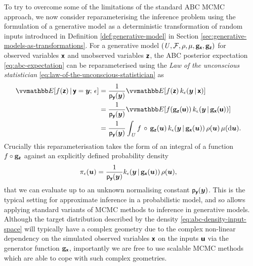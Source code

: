 To try to overcome some of the limitations of the standard \ac{ABC} \ac{MCMC} approach, we now consider reparameterising the inference problem using the formulation of a generative model as a deterministic transformation of random inputs introduced in Definition \ref{def:generative-model} in Section \ref{sec:generative-models-as-transformations}. For a generative model $(\mathit{U},\mathcal{F}\kern-.2pt,\rho,\mu,{\mathbf{g}}_{\boldsymbol{\mathsf{x}}},{\mathbf{g}}_{\boldsymbol{\mathsf{z}}})$ for observed variables $\boldsymbol{\mathsf{x}}$ and unobserved variables $\boldsymbol{\mathsf{z}}$, the \ac{ABC} posterior expectation \eqref{eq:abc-expectation} can be reparameterised using the \emph{Law of the unconscious statistician} \eqref{eq:law-of-the-unconscious-statistician} as
\begin{align}\nonumber
  \expc{f(\rvct{z}) \gvn \rvct{y}=\vct{y};\,\epsilon} &=
  \frac{1}{\pden{\rvct{y}}(\vct{y})} \expc{f(\rvct{z}) \, k_\epsilon(\vct{y}\gvn\rvct{x})}
  \\\label{eq:abc-expectation-input-space}
  &=
  \frac{1}{\pden{\rvct{y}}(\vct{y})} 
  \expc{f\lpa\genfunc_{\rvct{z}}(\rvct{u})\rpa \, k_\epsilon\lpa\vct{y}\gvn\genfunc_{\rvct{x}}(\rvct{u})\rpa}
  \\ \nonumber
  &=
  \frac{1}{\pden{\rvct{y}}(\vct{y})}
  \int_{\set{U}} 
    f\,\circ\,\genfunc_{\rvct{z}}(\vct{u}) \,
    k_\epsilon{\lpa\vct{y}\gvn\genfunc_{\rvct{x}}(\vct{u})\rpa}\,
    \rho(\vct{u})
  \,\mu(\dr\vct{u}).
\end{align}
Crucially this reparameterisation takes the form of an integral of a function $f\circ{\mathbf{g}}_{\boldsymbol{\mathsf{z}}}$ against an explicitly defined probability density
\begin{equation}\label{eq:abc-density-input-space}
  \pi_\epsilon(\vct{u}) = \frac{1}{\pden{\rvct{y}}(\vct{y})} 
  k_\epsilon{\lpa\vct{y}\gvn\genfunc_{\rvct{x}}(\vct{u})\rpa}\,\rho(\vct{u}),
\end{equation}
that we can evaluate up to an unknown normalising constant $\mathsf{p}_{\boldsymbol{\mathsf{y}}}(\boldsymbol{y})$. This is the typical setting for approximate inference in a probabilistic model, and so allows applying standard variants of \ac{MCMC} methods to inference in generative models. Although the target distribution described by the density \eqref{eq:abc-density-input-space} will typically have a complex geometry due to the complex non-linear dependency on the simulated observed variables $\boldsymbol{\mathsf{x}}$ on the inputs $\boldsymbol{\mathsf{u}}$ via the generator function ${\mathbf{g}}_{\boldsymbol{\mathsf{x}}}$, importantly we are free to use scalable \ac{MCMC} methods which are able to cope with such complex geometries. 

